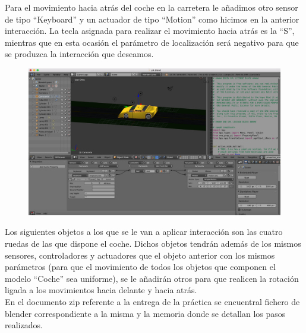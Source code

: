 \documentclass[10pt]{article}
\begin{document}
Para el movimiento hacia atrás del coche en la carretera le añadimos otro sensor de tipo ``Keyboard'' y un actuador de tipo ``Motion'' como hicimos en la anterior interacción. La tecla asignada  para realizar el movimiento hacia atrás es la ``S'', mientras que en esta ocasión el parámetro de localización será negativo para que se produzca la interacción que deseamos. \\

\begin{figure}[H]
	\begin{center}
	 		\includegraphics[width = 1.00\textwidth]{Imagenes/p4-img4}
	\end{center} 
\end{figure}

Los siguientes objetos a los que se le van a aplicar interacción son las cuatro ruedas de las que dispone el coche. Dichos objetos tendrán además de los mismos sensores, controladores y actuadores que el objeto anterior con los mismos parámetros (para que el movimiento de todos los objetos que componen el modelo ``Coche'' sea uniforme), se le añadirán otros para que realicen la rotación ligada a los movimientos hacia delante y hacia atrás.\\

 


En el documento zip referente a la entrega de la práctica se encuentral fichero de blender correspondiente a la misma y la memoria donde se detallan los pasos realizados.
\end{document}
